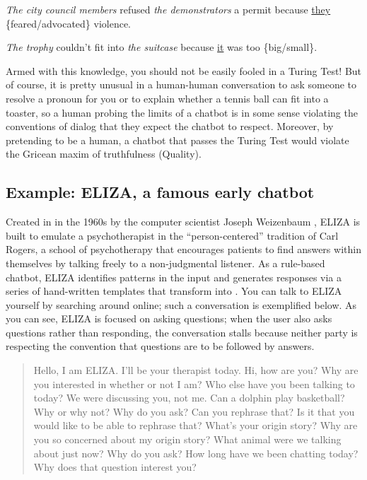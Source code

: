 \ea \label{city} \emph{The city council members} refused \emph{the demonstrators} a permit because \uline{they} \{feared/advocated\} violence.


\ex \label{trophy} \emph{The trophy} couldn't fit into \emph{the suitcase} because \uline{it} was too \{big/small\}.

\z 



Armed with this knowledge, you should not be easily fooled in a Turing Test! But of course, it is pretty unusual in a human-human conversation to ask someone to resolve a pronoun for you or to explain whether a tennis ball can fit into a toaster, so a human probing the limits of a chatbot is in some sense violating the conventions of dialog that they expect the chatbot to respect.    Moreover, by pretending to be a human, a chatbot that passes the Turing Test would violate the Gricean maxim of truthfulness (Quality).



\subsection{Example: ELIZA, a famous early chatbot} \label{eliza}

Created in in the 1960s by the computer scientist Joseph Weizenbaum \citep{Weizenbaum:1966}, ELIZA is  built to emulate a psychotherapist in the ``person-centered'' tradition of Carl Rogers, a school of psychotherapy that encourages patients to find answers within themselves by talking freely to a non-judgmental listener.  As a rule-based chatbot, ELIZA identifies patterns in the input and generates responses via a series of hand-written templates that transform  into .  You can talk to ELIZA yourself by searching around online; such a conversation is exemplified below.  As you can see, ELIZA is focused on asking questions; when the user also asks questions rather than responding, the conversation stalls because neither party is respecting the convention that questions are to be followed by answers.

\begin{quote}
 \begin{dialogue}
  Hello, I am ELIZA. I'll be your therapist today.
  Hi, how are you?
  Why are you interested in whether or not I am?
  Who else have you been talking to today?
  We were discussing you, not me.
  Can a dolphin play basketball? Why or why not?
  Why do you ask?
  Can you rephrase that?
  Is it that you would like to be able to rephrase that?
  What's your origin story?
  Why are you so concerned about my origin story?
  What animal were we talking about just now?
  Why do you ask?
  How long have we been chatting today?
  Why does that question interest you?
 \end{dialogue}
 \end{quote}



